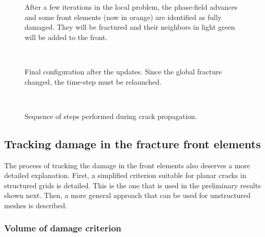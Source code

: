 \begin{figure}
{\begin{subfloatrow}[1]
        {\caption{After a few iterations in the local problem, the phase-field advances and some front elements (now in orange) are identified as fully damaged. They will be fractured and their neighbors in light green will be added to the front.}}
      \end{subfloatrow}\\
      \begin{subfloatrow}[1]
        { \caption{Final configuration after the updates. Since the global fracture changed, the time-step must be relaunched.}}
      \end{subfloatrow}\\
      }{\caption{Sequence of steps performed during crack propagation.}
      \label{fig:crack_prop_steps}}
  \end{figure}

\FloatBarrier

\subsection{Tracking damage in the fracture front elements}\label{frontTrackingAlgo}

The process of tracking the damage in the front elements also deserves a more detailed explanation. First, a simplified criterion suitable for planar cracks in structured grids is detailed. This is the one that is used in the preliminary results shown next. Then, a more general approach that can be used for unstructured meshes is described.

\subsubsection{Volume of damage criterion}

